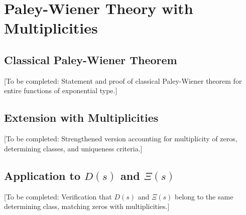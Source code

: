 \section{Paley-Wiener Theory with Multiplicities}

\subsection{Classical Paley-Wiener Theorem}

[To be completed: Statement and proof of classical Paley-Wiener theorem for entire functions of exponential type.]

\subsection{Extension with Multiplicities}

[To be completed: Strengthened version accounting for multiplicity of zeros, determining classes, and uniqueness criteria.]

\subsection{Application to $D(s)$ and $\Xi(s)$}

[To be completed: Verification that $D(s)$ and $\Xi(s)$ belong to the same determining class, matching zeros with multiplicities.]
